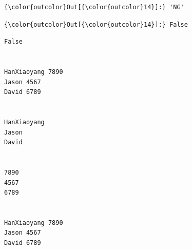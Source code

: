 \documentclass[11pt]{article}
\begin{document}
\begin{Verbatim}[commandchars=\\\{\}]
{\color{outcolor}Out[{\color{outcolor}14}]:} 'NG'
\end{Verbatim}
            
\begin{Verbatim}[commandchars=\\\{\}]
{\color{outcolor}Out[{\color{outcolor}14}]:} False
\end{Verbatim}
            
    \begin{Verbatim}[commandchars=\\\{\}]
False


HanXiaoyang 7890
Jason 4567
David 6789


HanXiaoyang
Jason
David


7890
4567
6789


HanXiaoyang 7890
Jason 4567
David 6789

    \end{Verbatim}
\end{document}
